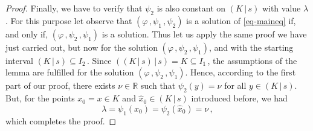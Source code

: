 \documentclass[10pt,a4paper]{amsart}
\newcommand{\RR}{\mathbb{R}}
\newcommand{\rfl}[2]{\left( #1 \, \vert \, #2 \right)}
\begin{document}
\begin{proof}
Finally, we have to verify that 
$ \psi_2 $ is also constant on $ \rfl{K}{s} $ 
with value $ \lambda $. 
For this purpose let observe that 
$ \left( \varphi \,, \psi_1 \,, \psi_2 \right) $ 
is a solution of \eqref{eq-maineq} if, 
and only if, 
$ \left( \varphi \,, \psi_2 \,, \psi_1 \right) $ 
is a solution. 
Thus let us apply the same proof we have just carried out, 
but now for the solution 
$ \left( \varphi \,, \psi_2 \,, \psi_1 \right) $, 
and with the starting interval 
$ \rfl{K}{s} \subseteq I_2 \,$. 
Since 
$ \rfl{\rfl{K}{s}}{s} = K \subseteq I_1 \,$, 
the assumptions of the lemma are fulfilled 
for the solution 
$ \left( \varphi \,, \psi_2 \,, \psi_1 \right) $. 
Hence, according to the first part of our proof, 
there exists $ \nu \in \RR $ such that 
$ \psi_2(y) = \nu $ for all 
$ y \in \rfl{K}{s} $. 
But, for the 
points 
$ x_0 = x \in K $ and 
$ \widehat{x}_0 \in \rfl{K}{s}$ 
introduced before, we had 
\[
\lambda = \psi_1(x_0) = \psi_2(\widehat{x}_0) = \nu \,, 
\]
which completes the proof. 
\end{proof}
\end{document}
